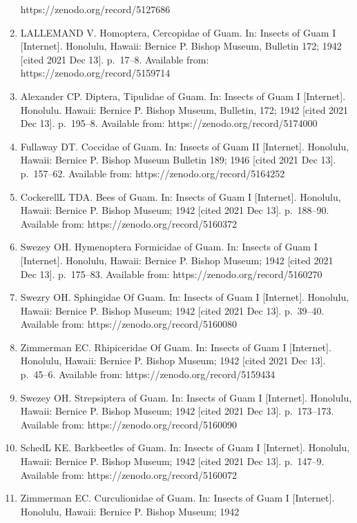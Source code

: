 \documentclass[
]{article}
\begin{document}
\begin{enumerate}
  https://zenodo.org/record/5127686
\item
  LALLEMAND V. Homoptera, Cercopidae of Guam. In: Insects of Guam I
  {[}Internet{]}. Honolulu, Hawaii: Bernice P. Bishop Museum, Bulletin
  172; 1942 {[}cited 2021 Dec 13{]}. p.~17--8. Available from:
  https://zenodo.org/record/5159714
\item
  Alexander CP. Diptera, Tipulidae of Guam. In: Insects of Guam I
  {[}Internet{]}. Honolulu. Hawaii: Bernice P. Bishop Museum, Bulletin,
  172; 1942 {[}cited 2021 Dec 13{]}. p.~195--8. Available from:
  https://zenodo.org/record/5174000
\item
  Fullaway DT. Coccidae of Guam. In: Insects of Guam II {[}Internet{]}.
  Honolulu, Hawaii: Bernice P. Bishop Museum Bulletin 189; 1946 {[}cited
  2021 Dec 13{]}. p.~157--62. Available from:
  https://zenodo.org/record/5164252
\item
  CockerellL TDA. Bees of Guam. In: Insects of Guam I {[}Internet{]}.
  Honolulu, Hawaii: Bernice P. Bishop Museum; 1942 {[}cited 2021 Dec
  13{]}. p.~188--90. Available from: https://zenodo.org/record/5160372
\item
  Swezey OH. Hymenoptera Formicidae of Guam. In: Insects of Guam I
  {[}Internet{]}. Honolulu, Hawaii: Bernice P. Bishop Museum; 1942
  {[}cited 2021 Dec 13{]}. p.~175--83. Available from:
  https://zenodo.org/record/5160270
\item
  Swezry OH. Sphingidae Of Guam. In: Insects of Guam I {[}Internet{]}.
  Honolulu, Hawaii: Bernice P. Bishop Museum; 1942 {[}cited 2021 Dec
  13{]}. p.~39--40. Available from: https://zenodo.org/record/5160080
\item
  Zimmerman EC. Rhipiceridae Of Guam. In: Insects of Guam I
  {[}Internet{]}. Honolulu, Hawaii: Bernice P. Bishop Museum; 1942
  {[}cited 2021 Dec 13{]}. p.~45--6. Available from:
  https://zenodo.org/record/5159434
\item
  Swezey OH. Strepsiptera of Guam. In: Insects of Guam I {[}Internet{]}.
  Honolulu, Hawaii: Bernice P. Bishop Museum; 1942 {[}cited 2021 Dec
  13{]}. p.~173--173. Available from: https://zenodo.org/record/5160090
\item
  SchedL KE. Barkbeetles of Guam. In: Insects of Guam I {[}Internet{]}.
  Honolulu, Hawaii: Bernice P. Bishop Museum; 1942 {[}cited 2021 Dec
  13{]}. p.~147--9. Available from: https://zenodo.org/record/5160072
\item
  Zimmerman EC. Curculionidae of Guam. In: Insects of Guam I
  {[}Internet{]}. Honolulu, Hawaii: Bernice P. Bishop Museum; 1942

\end{enumerate}
\end{document}
